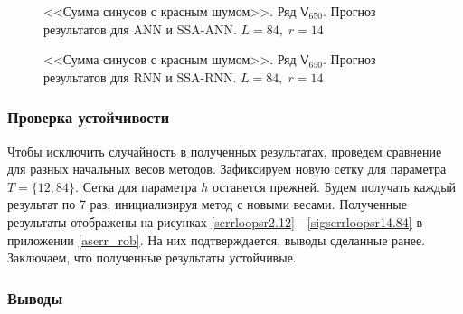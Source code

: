 \documentclass[specialist,
               substylefile = spbu.rtx,
               subf,href,colorlinks=true, 12p]{disser}
\newcommand{\multiref}[2]{\ref{#1}---\ref{#2}}
\begin{document}
\begin{figure}[H]
	\captionsetup{justification=centering}
	\caption{<<Сумма синусов с красным шумом>>. Ряд $\mathsf{V}_{650}$. Прогноз результатов для ANN и SSA-ANN. $L = 84, \; r = 14$}
	\label{serr_r14_res_ann}
\end{figure}

\begin{figure}[H]
	\captionsetup{justification=centering}
	\caption{<<Сумма синусов с красным шумом>>. Ряд $\mathsf{V}_{650}$. Прогноз результатов для RNN и SSA-RNN. $L = 84, \; r = 14$}
	\label{serr_r14_res_rnn}
\end{figure}

\subsubsection{Проверка устойчивости}
\label{serr_rob}

Чтобы исключить случайность в полученных результатах, проведем сравнение для разных начальных весов методов. Зафиксируем новую сетку для параметра $T = \{12, 84\}$. Сетка для параметра $h$ останется прежней. Будем получать каждый результат по 7 раз, инициализируя метод с новыми весами. Полученные результаты отображены на рисунках \multiref{serrloopsr2.12}{sigserrloopsr14.84} в приложении \ref{aserr_rob}. На них подтверждается, выводы сделанные ранее. Заключаем, что полученные результаты устойчивые.

\subsubsection{Выводы}
\end{document}
